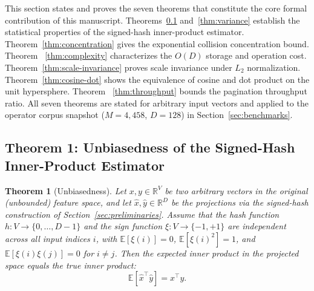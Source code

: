 \documentclass[10pt,twocolumn]{article}
\newtheorem{theorem}{Theorem}
\theoremstyle{definition}
\theoremstyle{remark}
\begin{document}
This section states and proves the seven theorems that constitute the
core formal contribution of this manuscript. Theorems~\ref{thm:unbiased}
and~\ref{thm:variance} establish the statistical properties of the
signed-hash inner-product estimator. Theorem~\ref{thm:concentration}
gives the exponential collision concentration bound. Theorem~
\ref{thm:complexity} characterizes the $O(D)$ storage and operation
cost. Theorem~\ref{thm:scale-invariance} proves scale invariance under
$L_2$ normalization. Theorem~\ref{thm:cosine-dot} shows the equivalence
of cosine and dot product on the unit hypersphere. Theorem~
\ref{thm:throughput} bounds the pagination throughput ratio. All seven
theorems are stated for arbitrary input vectors and applied to the
operator corpus snapshot ($M = 4{,}458$, $D = 128$) in
Section~\ref{sec:benchmarks}.

\subsection{Theorem 1: Unbiasedness of the Signed-Hash Inner-Product Estimator}
\label{thm:unbiased}

\begin{theorem}[Unbiasedness]
Let $x, y \in \mathbb{R}^V$ be two arbitrary vectors in the original
(unbounded) feature space, and let $\hat{x}, \hat{y} \in \mathbb{R}^D$
be the projections via the signed-hash construction of
Section~\ref{sec:preliminaries}. Assume that the hash function
$h: V \to \{0, \ldots, D-1\}$ and the sign function $\xi: V \to \{-1,
+1\}$ are independent across all input indices $i$, with
$\mathbb{E}[\xi(i)] = 0$, $\mathbb{E}[\xi(i)^2] = 1$, and
$\mathbb{E}[\xi(i) \xi(j)] = 0$ for $i \neq j$. Then the expected
inner product in the projected space equals the true inner product:
\begin{equation}
\mathbb{E}[\hat{x}^\top \hat{y}] = x^\top y.
\label{eq:thm1-statement}
\end{equation}
\end{theorem}
\end{document}
